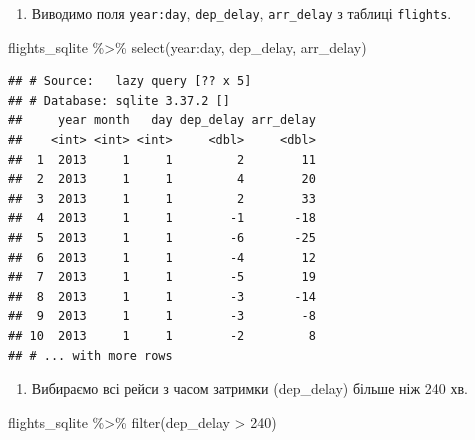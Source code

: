 \documentclass[
]{book}
\newenvironment{Shaded}{\begin{snugshade}}{\end{snugshade}}
\newcommand{\DecValTok}[1]{\textcolor[rgb]{0.00,0.00,0.81}{#1}}
\newcommand{\FunctionTok}[1]{\textcolor[rgb]{0.00,0.00,0.00}{#1}}
\newcommand{\NormalTok}[1]{#1}
\newcommand{\SpecialCharTok}[1]{\textcolor[rgb]{0.00,0.00,0.00}{#1}}
\providecommand{\tightlist}{%
  \setlength{\itemsep}{0pt}\setlength{\parskip}{0pt}}
\begin{document}
\begin{enumerate}
\def\labelenumi{\arabic{enumi}.}
\setcounter{enumi}{2}
\tightlist
\item
  Виводимо поля \texttt{year:day}, \texttt{dep\_delay}, \texttt{arr\_delay} з таблиці \texttt{flights}.
\end{enumerate}

\begin{Shaded}
\begin{Highlighting}[]
\NormalTok{flights\_sqlite }\SpecialCharTok{\%\textgreater{}\%} \FunctionTok{select}\NormalTok{(year}\SpecialCharTok{:}\NormalTok{day, dep\_delay, arr\_delay)}
\end{Highlighting}
\end{Shaded}

\begin{verbatim}
## # Source:   lazy query [?? x 5]
## # Database: sqlite 3.37.2 []
##     year month   day dep_delay arr_delay
##    <int> <int> <int>     <dbl>     <dbl>
##  1  2013     1     1         2        11
##  2  2013     1     1         4        20
##  3  2013     1     1         2        33
##  4  2013     1     1        -1       -18
##  5  2013     1     1        -6       -25
##  6  2013     1     1        -4        12
##  7  2013     1     1        -5        19
##  8  2013     1     1        -3       -14
##  9  2013     1     1        -3        -8
## 10  2013     1     1        -2         8
## # ... with more rows
\end{verbatim}

\begin{enumerate}
\def\labelenumi{\arabic{enumi}.}
\setcounter{enumi}{3}
\tightlist
\item
  Вибираємо всі рейси з часом затримки (dep\_delay) більше ніж 240 хв.
\end{enumerate}

\begin{Shaded}
\begin{Highlighting}[]
\NormalTok{flights\_sqlite }\SpecialCharTok{\%\textgreater{}\%} \FunctionTok{filter}\NormalTok{(dep\_delay }\SpecialCharTok{\textgreater{}} \DecValTok{240}\NormalTok{)}
\end{Highlighting}
\end{Shaded}
\end{document}
